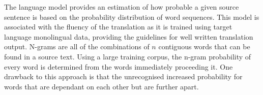 







The language model provides an estimation of how probable a given source sentence is based on the probability distribution of word sequences. This model is associated with the fluency of the translation as it is trained using target language monolingual data, providing the guidelines for well written translation output. N-grams are all of the combinations of $n$ contiguous words that can be found in a source text. Using a large training corpus, the n-gram probability of every word is determined from the words immediately proceeding it. One drawback to this approach is that the unrecognised increased probability for words that are dependant on each other but are further apart.






